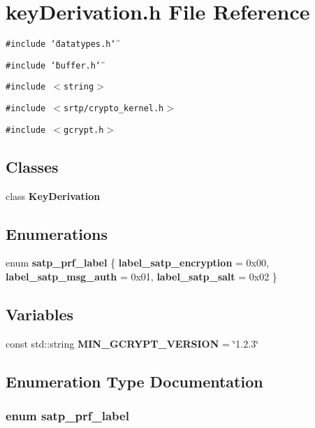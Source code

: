 \section{key\-Derivation.h File Reference}
\label{keyDerivation_8h}
{\tt \#include \char`\"{}datatypes.h\char`\"{}}\par
{\tt \#include \char`\"{}buffer.h\char`\"{}}\par
{\tt \#include $<$string$>$}\par
{\tt \#include $<$srtp/crypto\_\-kernel.h$>$}\par
{\tt \#include $<$gcrypt.h$>$}\par
\subsection*{Classes}
\begin{CompactItemize}
\item 
class {\bf Key\-Derivation}
\end{CompactItemize}
\subsection*{Enumerations}
\begin{CompactItemize}
\item 
enum {\bf satp\_\-prf\_\-label} \{ {\bf label\_\-satp\_\-encryption} =  0x00, 
{\bf label\_\-satp\_\-msg\_\-auth} =  0x01, 
{\bf label\_\-satp\_\-salt} =  0x02
 \}
\end{CompactItemize}
\subsection*{Variables}
\begin{CompactItemize}
\item 
const std::string {\bf MIN\_\-GCRYPT\_\-VERSION} = \char`\"{}1.2.3\char`\"{}
\end{CompactItemize}


\subsection{Enumeration Type Documentation}
\subsubsection{\setlength{\rightskip}{0pt plus 5cm}enum {\bf satp\_\-prf\_\-label}}\label{keyDerivation_8h_4829fcd87054af9b3ced79bbac1ce1eb}


